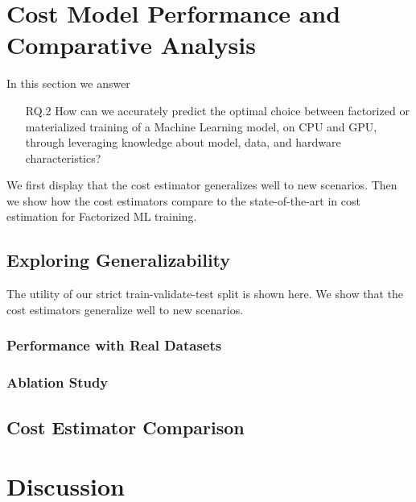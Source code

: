 
\section{Cost Model Performance and Comparative Analysis}
\label{sec:eval-model-evaluation}

In this section we answer
\begin{itemize}
  \item[RQ.2] How can we accurately predict the optimal choice between factorized or materialized training of a Machine Learning model, on CPU and GPU, through leveraging knowledge about model, data, and hardware characteristics?
\end{itemize}

We first display that the cost estimator generalizes well to new scenarios. Then we show how the cost estimators compare to the state-of-the-art in cost estimation for Factorized ML training.

\subsection{Exploring Generalizability}
The utility of our strict train-validate-test split is shown here. We show that the cost estimators generalize well to new scenarios.

\subsubsection{Performance with Real Datasets}
\label{subsubsec:6-real-datasets}

\subsubsection{Ablation Study}
\label{subsubsec:6-ablation}


\subsection{Cost Estimator Comparison}


\section{Discussion}
\label{sec:eval-discussion}

